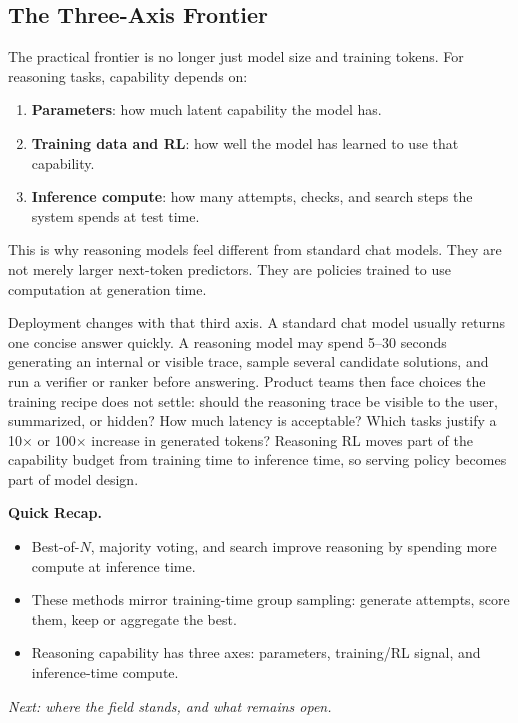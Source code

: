 \subsection{The Three-Axis Frontier}

The practical frontier is no longer just model size and training tokens. For reasoning tasks, capability depends on:

\begin{enumerate}[nosep]
  \item \textbf{Parameters}: how much latent capability the model has.
  \item \textbf{Training data and RL}: how well the model has learned to use that capability.
  \item \textbf{Inference compute}: how many attempts, checks, and search steps the system spends at test time.
\end{enumerate}

This is why reasoning models feel different from standard chat models. They are not merely larger next-token predictors. They are policies trained to use computation at generation time.

Deployment changes with that third axis. A standard chat model usually returns one concise answer quickly. A reasoning model may spend 5--30 seconds generating an internal or visible trace, sample several candidate solutions, and run a verifier or ranker before answering. Product teams then face choices the training recipe does not settle: should the reasoning trace be visible to the user, summarized, or hidden? How much latency is acceptable? Which tasks justify a 10$\times$ or 100$\times$ increase in generated tokens? Reasoning RL moves part of the capability budget from training time to inference time, so serving policy becomes part of model design.

\noindent{}

\begin{quickrecap}
\textbf{Quick Recap.}
\begin{itemize}[nosep,leftmargin=1.5em]
  \item Best-of-$N$, majority voting, and search improve reasoning by spending more compute at inference time.
  \item These methods mirror training-time group sampling: generate attempts, score them, keep or aggregate the best.
  \item Reasoning capability has three axes: parameters, training/RL signal, and inference-time compute.
\end{itemize}
\textit{Next: where the field stands, and what remains open.}
\end{quickrecap}



